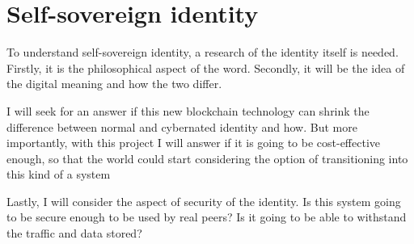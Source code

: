\documentclass[a4paper,11pt]{report}
\begin{document}
\section{Self-sovereign identity}
\label{selfIdentity}
To understand self-sovereign identity, a research of the identity itself is needed. Firstly, it is the philosophical aspect of the word. Secondly, it will be the idea of the digital meaning and how the two differ. 

I will seek for an answer if this new blockchain technology can shrink the difference between normal and cybernated identity and how. But more importantly, with this project I will answer if it is going to be cost-effective enough, so that the world could start considering the option of transitioning into this kind of a system

Lastly, I will consider the aspect of security of the identity. Is this system going to be secure enough to be used by real peers? Is it going to be able to withstand the traffic and data stored?






\end{document}
